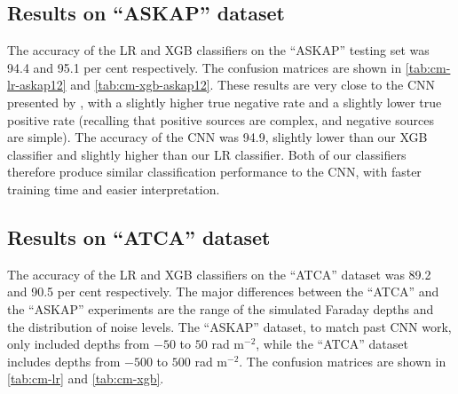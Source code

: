   \subsection{Results on ``ASKAP'' dataset}
  \label{sec:faraday-cnn-comparison}

    The accuracy of the LR and XGB classifiers on the ``ASKAP'' testing set was 94.4 and 95.1 per cent respectively. The confusion matrices are shown in \autoref{tab:cm-lr-askap12} and \autoref{tab:cm-xgb-askap12}. These results are very close to the CNN presented by \citet{brown_classifying_2018}, with a slightly higher true negative rate and a slightly lower true positive rate (recalling that positive sources are complex, and negative sources are simple). The accuracy of the CNN was 94.9, slightly lower than our XGB classifier and slightly higher than our LR classifier. Both of our classifiers therefore produce similar classification performance to the CNN, with faster training time and easier interpretation.

  \subsection{Results on ``ATCA'' dataset}
  \label{sec:faraday-results-simulated}

    The accuracy of the LR and XGB classifiers on the ``ATCA'' dataset was 89.2 and 90.5 per cent respectively. The major differences between the ``ATCA'' and the ``ASKAP'' experiments are the range of the simulated Faraday depths and the distribution of noise levels. The ``ASKAP'' dataset, to match past CNN work, only included depths from $-50$ to $50$ rad m$^{-2}$, while the ``ATCA'' dataset includes depths from $-500$ to $500$ rad m$^{-2}$. The confusion matrices are shown in \autoref{tab:cm-lr} and \autoref{tab:cm-xgb}.

